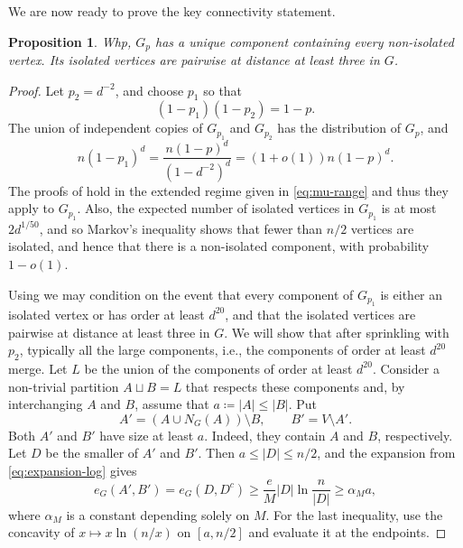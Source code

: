 \documentclass[10pt,a4paper]{article}
\newtheorem{proposition}[thm]{Proposition}
\begin{document}
We are now ready to prove the key connectivity statement.

\begin{proposition}\label{prop:unique-component}
Whp, $G_p$ has a unique component containing every non-isolated vertex.
Its isolated vertices are pairwise at distance at least three in $G$.
\end{proposition}

\begin{proof}
Let $p_2=d^{-2}$, and choose $p_1$ so that
\[
  (1-p_1)(1-p_2)=1-p.
\]
The union of independent copies of $G_{p_1}$ and $G_{p_2}$ has the distribution of $G_p$, and
\[
  n(1-p_1)^d=\frac{n(1-p)^d}{(1-d^{-2})^d}=(1+o(1))n (1-p)^d.
\]
The proofs of  hold in the extended regime given in \eqref{eq:mu-range} and thus they apply to $G_{p_1}$.
Also, the expected number of isolated vertices in $G_{p_1}$ is at most $2d^{1/50}$, and so Markov's inequality shows that fewer than $n/2$ vertices are isolated, and hence that there is a non-isolated component, with probability $1-o(1)$.

Using  we may condition on the event that every component of $G_{p_1}$ is either an isolated vertex or has order at least $d^{20}$, and that the isolated vertices are pairwise at distance at least three in $G$. We will show that after sprinkling with $p_2$, typically all the large components, i.e., the components of order at least $d^{20}$ merge.
Let $L$ be the union of the components of order at least $d^{20}$.
Consider a non-trivial partition $A\sqcup B=L$ that respects these components and, by interchanging $A$ and $B$, assume that $a\coloneqq |A|\le|B|$.
Put
\[
  A'=(A\cup N_G(A))\setminus B,
  \qquad B'=V\setminus A'.
\]
Both $A'$ and $B'$ have size at least $a$.
Indeed, they contain $A$ and $B$, respectively.
Let $D$ be the smaller of $A'$ and $B'$.
Then $a\le|D|\le n/2$, and the expansion from \eqref{eq:expansion-log} gives
\[
  e_G(A',B')=e_G(D,D^c)
  \ge \frac{e}{M}|D|\ln\frac{n}{|D|}
  \ge \alpha_Ma,
\]
where $\alpha_M$ is a constant depending solely on $M$.
For the last inequality, use the concavity of $x\mapsto x\ln(n/x)$ on $[a,n/2]$ and evaluate it at the endpoints.


\end{proof}
\end{document}
